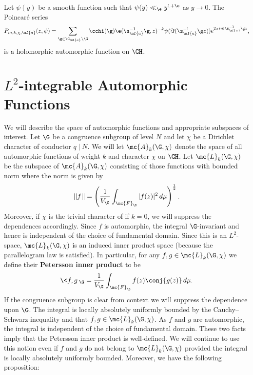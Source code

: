     \begin{theorem}
      Let $\psi(y)$ be a smooth function such that $\psi(y) \ll_{\e} y^{1+\e}$ as $y \to 0$. The Poincar\'e series
      \[
        P_{m,k,\chi,\mf{a}}(z,\psi) = \sum_{\g \in \G_{\mf{a}}\backslash\G}\cchi(\g)\e(\s_{\mf{a}}^{-1}\g,z)^{-k}\psi(\Im(\s_{\mf{a}}^{-1}\g z))e^{2\pi im\s_{\mf{a}}^{-1}\g z},
      \]
      is a holomorphic automorphic function on $\GH$.
    \end{theorem}
  \section{\texorpdfstring{$L^{2}$}{L{2}}-integrable Automorphic Functions}
    We will describe the space of automorphic functions and appropriate subspaces of interest. Let $\G$ be a congruence subgroup of level $N$ and let $\chi$ be a Dirichlet character of conductor $q \mid N$. We will let $\mc{A}_{k}(\G,\chi)$ denote the space of all automorphic functions of weight $k$ and character $\chi$ on $\GH$. Let $\mc{L}_{k}(\G,\chi)$ be the subspace of $\mc{A}_{k}(\G,\chi)$ consisting of those functions with bounded norm where the norm is given by
    \[
      ||f|| = \left(\frac{1}{V_{\G}}\int_{\mc{F}_{\G}}|f(z)|^{2}\,d\mu\right)^{\frac{1}{2}}.
    \]
    Moreover, if $\chi$ is the trivial character of if $k = 0$, we will suppress the dependences accordingly. Since $f$ is automorphic, the integral $\G$-invariant and hence is independent of the choice of fundamental domain. Since this is an $L^{2}$-space, $\mc{L}_{k}(\G,\chi)$ is an induced inner product space (because the parallelogram law is satisfied). In particular, for any $f,g \in \mc{L}_{k}(\G,\chi)$ we define their \textbf{Petersson inner product} to be
    \[
      \<f,g\>_{\G} = \frac{1}{V_{\G}}\int_{\mc{F}_{\G}}f(z)\conj{g(z)}\,d\mu.
    \]
    If the congruence subgroup is clear from context we will suppress the dependence upon $\G$. The integral is locally absolutely uniformly bounded by the Cauchy–Schwarz inequality and that $f,g \in \mc{L}_{k}(\G,\chi)$. As $f$ and $g$ are automorphic, the integral is independent of the choice of fundamental domain. These two facts imply that the Petersson inner product is well-defined. We will continue to use this notion even if $f$ and $g$ do not belong to $\mc{L}_{k}(\G,\chi)$ provided the integral is locally absolutely uniformly bounded. Moreover, we have the following proposition:

